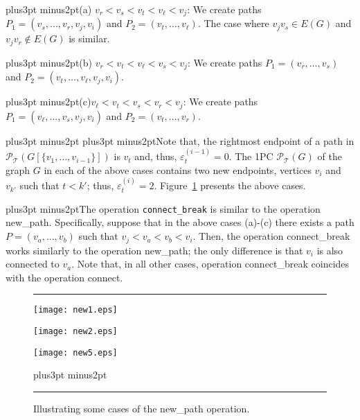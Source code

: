 \documentclass[10pt]{article}
\def\yskip{\penalty-50\vskip3pt plus3pt minus2pt}
\def\y{\yskip}
\def\yy{\yskip\yskip}
\begin{document}
{\y \noindent (a) $v_r<v_s<v_t<v_\ell<v_j$: We create paths
$P_1=(v_s, \ldots, v_r, v_j, v_i)$ and $P_2=(v_t, \ldots,
v_\ell)$. The case \phantom{(a) }where $v_jv_s \in E(G)$ and
$v_jv_r \notin E(G)$ is similar.

\y \noindent (b) $v_r<v_t<v_\ell<v_s<v_j$: We create paths
$P_1=(v_r, \ldots, v_s)$ and $P_2=(v_t, \ldots, v_\ell, v_j,
v_i)$.

\y \noindent (c)\phantom{c}$v_\ell<v_t<v_s<v_r<v_j$: We create
paths $P_1=(v_\ell, \ldots, v_s, v_j, v_i)$ and $P_2=(v_t, \ldots,
v_r)$.



\yy Note that, the rightmost endpoint of a path in
$\mathcal{P_{\mathcal{T}}}(G[\{v_1, \ldots, v_{i-1}\}])$ is $v_t$
and, thus, $\varepsilon^{(i-1)}_t=0$. The 1PC
$\mathcal{P_{\mathcal{T}}}(G)$ of the graph $G$ in each of the
above cases contains two new endpoints, vertices $v_i$ and
$v_{k'}$ such that $t<k'$; thus, $\varepsilon^{(i)}_t=2$.
Figure~\ref{newOP} presents the above cases.

\y The operation {\tt connect\_break} is similar to the operation
new\_path. Specifically, suppose that in the above cases (a)-(c)
there exists a path $P=(v_a, \ldots, v_b)$ such that
$v_j<v_a<v_b<v_i$. Then, the operation connect\_break works
similarly to the operation new\_path; the only difference is that
$v_i$ is also connected to $v_a$. Note that, in all other cases,
operation connect\_break coincides with the operation connect.

\begin{figure}[t]
\hrule \bigskip \hspace*{0.6in}
   \begin{minipage}[l]{2in}
\texttt{[image: new1.eps]}
\end{minipage}
\vspace{0.2in}

\hspace*{0.6in}
  \begin{minipage}[r]{2in}
    \texttt{[image: new2.eps]}
\end{minipage}
\vspace{0.2in}

\hspace*{0.6in}
  \begin{minipage}[c]{2in}
   \texttt{[image: new5.eps]}
\end{minipage}

    \y\caption{\small{Illustrating some cases of the new\_path operation.}}
\bigskip \hrule
 \label{newOP}
\end{figure}



}
\end{document}
